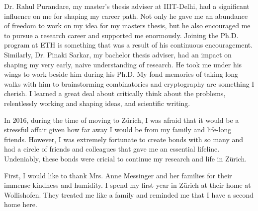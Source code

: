 Dr. Rahul Purandare, my master's thesis adviser at IIIT-Delhi, had a significant influence on me for shaping my career path. Not only he gave me an abundance of freedom to work on my idea for my masters thesis, but he also encouraged me to pursue a research career and supported me enormously. Joining the Ph.D. program at ETH is something that was a result of his continuous encouragement. Similarly, Dr. Pinaki Sarkar, my bachelor thesis adviser, had an impact on shaping my very early, naive understanding of research. He took me under his wings to work beside him during his Ph.D. My fond memories of taking long walks with him to brainstorming combinatorics and cryptography are something I cherish. I learned a great deal about critically think about the problems, relentlessly working and shaping ideas, and scientific writing.


In 2016, during the time of moving to Z\"urich, I was afraid that it would be a stressful affair given how far away I would be from my family and life-long friends. However, I was extremely fortunate to create bonds with so many and had a circle of friends and colleagues that gave me an essential lifeline. Undeniably, these bonds were cricial to continue my research and life in Z\"urich. 


First, I would like to thank Mrs. Anne Messinger and her families for their immense kindness and humidity. I spend my first year in Z\"urich at their home at Wollishofen. They treated me like a family and reminded me that I have a second home here. 


